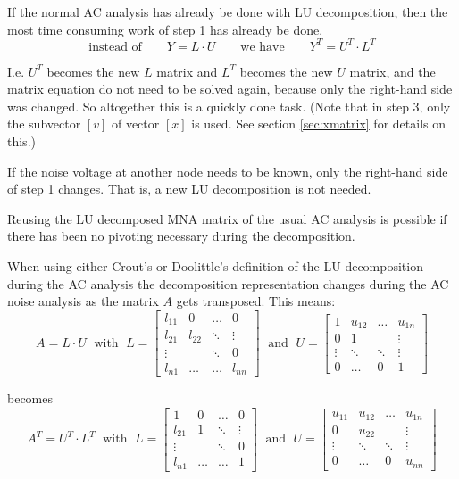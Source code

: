 \addvspace{12pt}

If the normal AC analysis has already be done with LU decomposition,
then the most time consuming work of step 1 has already be done.
\begin{equation}
\textrm{instead of} \qquad Y = L\cdot U \qquad \textrm{we have} \qquad
Y^T = U^T \cdot L^T
\end{equation}

I.e. $U^T$ becomes the new $L$ matrix and $L^T$ becomes the new $U$
matrix, and the matrix equation do not need to be solved again, because
only the right-hand side was changed.  So altogether this is a quickly
done task.  (Note that in step 3, only the subvector $[v]$ of vector
$[x]$ is used.  See section \ref{sec:xmatrix} for details on this.)

\addvspace{12pt}

If the noise voltage at another node needs to be known, only the
right-hand side of step 1 changes.  That is, a new LU decomposition is
not needed.

\addvspace{12pt}

Reusing the LU decomposed MNA matrix of the usual AC analysis is
possible if there has been no pivoting necessary during the
decomposition.

\addvspace{12pt}

When using either Crout's or Doolittle's definition of the LU
decomposition during the AC analysis the decomposition representation
changes during the AC noise analysis as the matrix $A$ gets
transposed.  This means:
\begin{equation}
A = L\cdot U \;\text{ with }\;
L = 
\begin{bmatrix}
l_{11} & 0 & \ldots & 0\\
l_{21} & l_{22} & \ddots & \vdots\\
\vdots &  & \ddots & 0\\
l_{n1} & \ldots & \ldots & l_{nn}
\end{bmatrix}
\;\text{ and }\;
U =
\begin{bmatrix}
1 & u_{12} & \ldots & u_{1n}\\
0 & 1 &  & \vdots\\
\vdots & \ddots & \ddots & \vdots\\
0 & \ldots & 0 & 1
\end{bmatrix}
\end{equation}

becomes
\begin{equation}
A^T = U^T\cdot L^T \;\text{ with }\;
L = 
\begin{bmatrix}
1 & 0 & \ldots & 0\\
l_{21} & 1 & \ddots & \vdots\\
\vdots &  & \ddots & 0\\
l_{n1} & \ldots & \ldots & 1
\end{bmatrix}
\;\text{ and }\;
U =
\begin{bmatrix}
u_{11} & u_{12} & \ldots & u_{1n}\\
0 & u_{22} &  & \vdots\\
\vdots & \ddots & \ddots & \vdots\\
0 & \ldots & 0 & u_{nn}
\end{bmatrix}
\end{equation}

